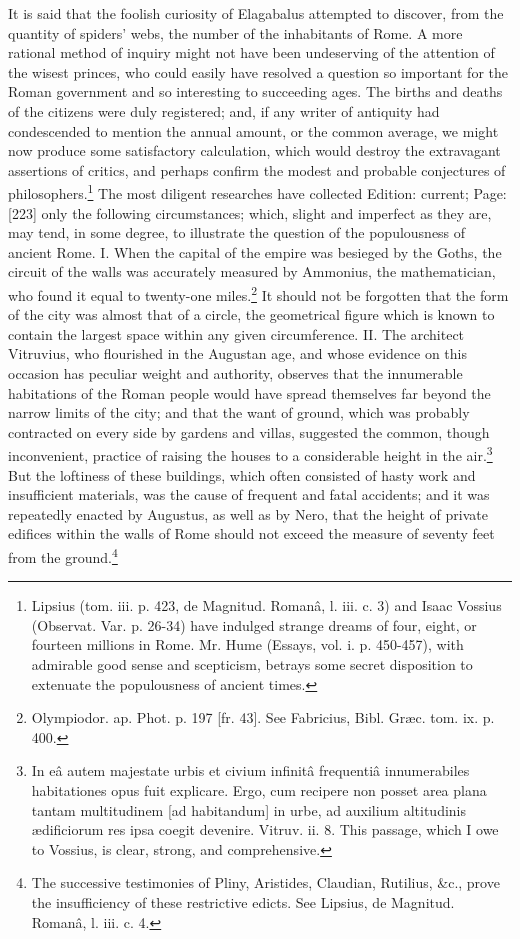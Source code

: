 It is said that the foolish curiosity of Elagabalus attempted to discover, from the quantity of spiders\texthebrew{}’ webs, the number of the inhabitants of Rome. A more rational method of inquiry might not have been undeserving of the attention of the wisest princes, who could easily have resolved a question so important for the Roman government and so interesting to succeeding ages. The births and deaths of the citizens were duly registered; and, if any writer of antiquity had condescended to mention the annual amount, or the common average, we might now produce some satisfactory calculation, which would destroy the extravagant assertions of critics, and perhaps confirm the modest and probable conjectures of philosophers.\footnote{Lipsius (tom. iii. p. 423, de Magnitud. Romanâ, l. iii. c. 3) and Isaac Vossius (Observat. Var. p. 26-34) have indulged strange dreams of four, eight, or fourteen millions in Rome. Mr. Hume (Essays, vol. i. p. 450-457), with admirable good sense and scepticism, betrays some secret disposition to extenuate the populousness of ancient times.} The most diligent researches have collected Edition: current; Page: [223] only the following circumstances; which, slight and imperfect as they are, may tend, in some degree, to illustrate the question of the populousness of ancient Rome. I. When the capital of the empire was besieged by the Goths, the circuit of the walls was accurately measured by Ammonius, the mathematician, who found it equal to twenty-one miles.\footnote{Olympiodor. ap. Phot. p. 197 [fr. 43]. See Fabricius, Bibl. Græc. tom. ix. p. 400.} It should not be forgotten that the form of the city was almost that of a circle, the geometrical figure which is known to contain the largest space within any given circumference. II. The architect Vitruvius, who flourished in the Augustan age, and whose evidence on this occasion has peculiar weight and authority, observes that the innumerable habitations of the Roman people would have spread themselves far beyond the narrow limits of the city; and that the want of ground, which was probably contracted on every side by gardens and villas, suggested the common, though inconvenient, practice of raising the houses to a considerable height in the air.\footnote{In eâ autem majestate urbis et civium infinitâ frequentiâ innumerabiles habitationes opus fuit explicare. Ergo, cum recipere non posset area plana tantam multitudinem [ad habitandum] in urbe, ad auxilium altitudinis ædificiorum res ipsa coegit devenire. Vitruv. ii. 8. This passage, which I owe to Vossius, is clear, strong, and comprehensive.} But the loftiness of these buildings, which often consisted of hasty work and insufficient materials, was the cause of frequent and fatal accidents; and it was repeatedly enacted by Augustus, as well as by Nero, that the height of private edifices within the walls of Rome should not exceed the measure of seventy feet from the ground.\footnote{The successive testimonies of Pliny, Aristides, Claudian, Rutilius, \&c., prove the insufficiency of these restrictive edicts. See Lipsius, de Magnitud. Romanâ, l. iii. c. 4.

}
